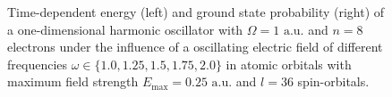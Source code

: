 \begin{figure}[!h]
    \centering
    \caption{Time-dependent energy (left) and ground state probability (right)
        of a one-dimensional harmonic oscillator with $\Omega=1 \text{ a.u.}$
        and $n=8$ electrons under the influence of a oscillating electric field 
        of different frequencies $\omega\in\{1.0, 1.25, 1.5, 1.75, 2.0\}$ in atomic 
        orbitals with 
        maximum field strength $E_\text{max}=0.25 \text{ a.u.}$ and $l=36$ 
        spin-orbitals.
    }
    \label{fig:1d_n8_qd_resonance}
\end{figure}

